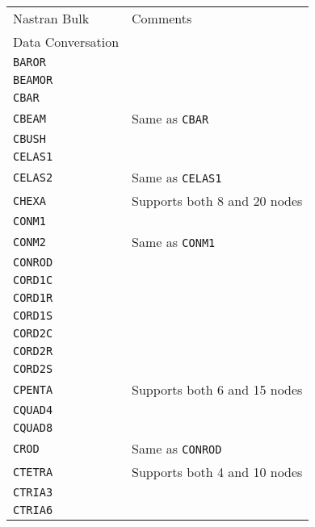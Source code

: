 \begin{tabular}{| m{} |  m{} |}
  \hline
  \rowcolor[HTML]{EFEFEF} Nastran Bulk      & Comments \\
  \rowcolor[HTML]{EFEFEF} Data Conversation &          \\
  \hline\hline
  {\tt BAROR}  & \\\hline
  {\tt BEAMOR} & \\\hline
  {\tt CBAR}   & \\\hline
  {\tt CBEAM}  & Same as {\tt CBAR} \\\hline
  {\tt CBUSH}  & \\\hline
  {\tt CELAS1} & \\\hline
  {\tt CELAS2} & Same as {\tt CELAS1} \\\hline
  {\tt CHEXA}  & Supports both 8 and 20 nodes \\\hline
  {\tt CONM1}  & \\\hline
  {\tt CONM2}  & Same as {\tt CONM1} \\\hline
  {\tt CONROD} & \\\hline
  {\tt CORD1C} & \\\hline
  {\tt CORD1R} & \\\hline
  {\tt CORD1S} & \\\hline
  {\tt CORD2C} & \\\hline
  {\tt CORD2R} & \\\hline
  {\tt CORD2S} & \\\hline
  {\tt CPENTA} & Supports both 6 and 15 nodes \\\hline
  {\tt CQUAD4} & \\\hline
  {\tt CQUAD8} & \\\hline
  {\tt CROD}   & Same as {\tt CONROD} \\\hline
  {\tt CTETRA} & Supports both 4 and 10 nodes \\\hline
  {\tt CTRIA3} & \\\hline
  {\tt CTRIA6} & \\\hline
\end{tabular}

